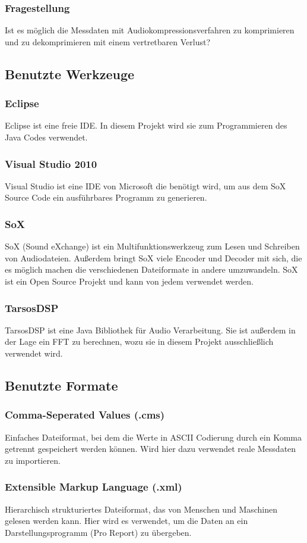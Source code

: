 \documentclass{article}
\begin{document}
{		\subsubsection{Fragestellung}
			Ist es möglich die Messdaten mit Audiokompressionsverfahren zu komprimieren und zu dekomprimieren mit einem vertretbaren Verlust?	
	\subsection{Benutzte Werkzeuge}
		\subsubsection{Eclipse}
			Eclipse ist eine freie IDE. In diesem Projekt wird sie zum Programmieren des Java Codes verwendet.
		\subsubsection{Visual Studio 2010}
			Visual Studio ist eine IDE von Microsoft die benötigt wird, um aus dem SoX Source Code ein ausführbares Programm zu generieren.
		\subsubsection{SoX}
			SoX (Sound eXchange) ist ein Multifunktionswerkzeug zum Lesen und Schreiben von Audiodateien. Außerdem bringt SoX viele Encoder und Decoder mit sich, die es möglich machen die verschiedenen Dateiformate in andere umzuwandeln. SoX ist ein Open Source Projekt und kann von jedem verwendet werden.
		\subsubsection{TarsosDSP}
			TarsosDSP ist eine Java Bibliothek für Audio Verarbeitung. Sie ist außerdem in der Lage ein FFT zu berechnen, wozu sie in diesem Projekt ausschließlich verwendet wird.
	\subsection{Benutzte Formate}
		\subsubsection{Comma-Seperated Values (.cms)}
			Einfaches Dateiformat, bei dem die Werte in ASCII Codierung durch ein Komma getrennt gespeichert werden können. Wird hier dazu verwendet reale Messdaten zu importieren.
		\subsubsection{Extensible Markup Language (.xml)}
			Hierarchisch strukturiertes Dateiformat, das von Menschen und Maschinen gelesen werden kann. Hier wird es verwendet, um die Daten an ein Darstellungsprogramm (Pro Report) zu übergeben.
}
\end{document}
